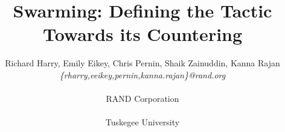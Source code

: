 \documentclass[11pt,letterpaper]{article}
\title{\Large{Swarming: Defining the Tactic Towards its Countering}}
\author{\normalsize{Richard Harry, Emily Eikey, Chris Pernin, Shaik Zainuddin,  Kanna Rajan
    }\\
  \emph{\{rharry,eeikey,pernin,kanna.rajan\}@rand.org}\\ \\
  RAND Corporation\\ \\ Tuskegee University}
\begin{document}
\maketitle{}











{\footnotesize
}
\end{document}
